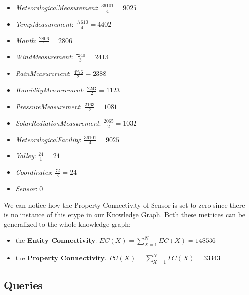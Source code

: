 \begin{itemize}
	\item \textit{MeteorologicalMeasurement}: $\frac{36101}{4} = 9025$
	\item \textit{TempMeasurement}: $\frac{17610}{4} = 4402$
	\item \textit{Month}: $\frac{2806}{1} = 2806$
	\item \textit{WindMeasurement}: $\frac{7240}{3} = 2413$
	\item \textit{RainMeasurement}: $\frac{4776}{2} = 2388$
	\item \textit{HumidityMeasurement}: $\frac{2247}{2} = 1123$
	\item \textit{PressureMeasurement}: $\frac{2163}{2} = 1081$
	\item \textit{SolarRadiationMeasurement}: $\frac{2065}{2} = 1032$
	\item \textit{MeteorologicalFacility}: $\frac{36101}{4} = 9025$
	\item \textit{Valley}: $\frac{24}{1} = 24$
	\item \textit{Coordinates}: $\frac{72}{3} = 24$
	\item \textit{Sensor}: $0$
\end{itemize}
We can notice how the 
Property Connectivity of Sensor is set to 
zero since there is no instance of this etype 
in our Knowledge Graph.
Both these metrices can be generalized to the whole knowledge graph:

\begin{itemize}
	\item the \textbf{Entity Connectivity}: $EC(X) = \sum^{N}_{X=1}{EC(X)} = 148536$
	\item the \textbf{Property Connectivity}: $PC(X) = \sum^{N}_{X=1}{PC(X)} = 33343$
\end{itemize}

\subsection{Queries}

